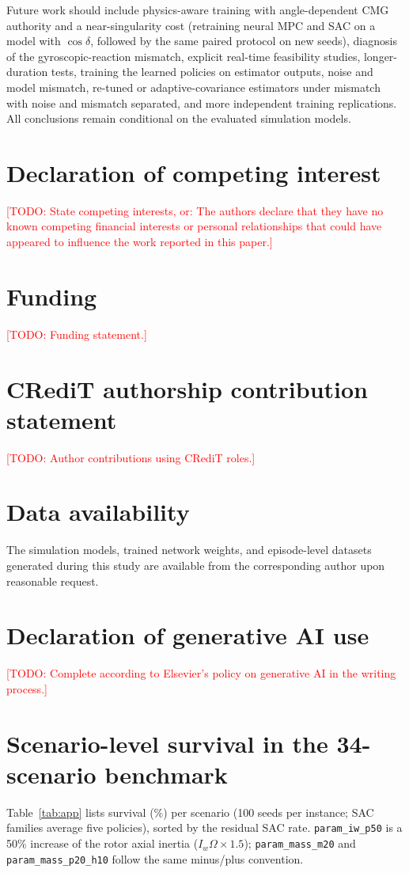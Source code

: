 \documentclass[preprint,12pt,authoryear=false]{elsarticle}
\theoremstyle{remark}\newtheorem{remark}{Remark}
\theoremstyle{plain}\newtheorem{proposition}{Proposition}\newtheorem{lemma}{Lemma}
\theoremstyle{definition}\newtheorem{assumption}{Assumption}
\newcommand{\todo}[1]{\textcolor{red}{[TODO: #1]}}
\begin{document}
Future work should include physics-aware training with angle-dependent CMG authority and a near-singularity cost (retraining neural MPC and SAC on a model with $\cos\delta$, followed by the same paired protocol on new seeds), diagnosis of the gyroscopic-reaction mismatch, explicit real-time feasibility studies, longer-duration tests, training the learned policies on estimator outputs, noise and model mismatch, re-tuned or adaptive-covariance estimators under mismatch with noise and mismatch separated, and more independent training replications. All conclusions remain conditional on the evaluated simulation models.

\section*{Declaration of competing interest}
\todo{State competing interests, or: The authors declare that they have no known competing financial interests or personal relationships that could have appeared to influence the work reported in this paper.}

\section*{Funding}
\todo{Funding statement.}

\section*{CRediT authorship contribution statement}
\todo{Author contributions using CRediT roles.}

\section*{Data availability}
The simulation models, trained network weights, and episode-level datasets generated during this study are available from the corresponding author upon reasonable request.

\section*{Declaration of generative AI use}
\todo{Complete according to Elsevier's policy on generative AI in the writing process.}

\appendix
\section{Scenario-level survival in the 34-scenario benchmark}
Table~\ref{tab:app} lists survival (\%) per scenario (100 seeds per instance; SAC families average five policies), sorted by the residual SAC rate. \texttt{param\_iw\_p50} is a 50\% increase of the rotor axial inertia ($I_w\Omega\times1.5$); \texttt{param\_mass\_m20} and \texttt{param\_mass\_p20\_h10} follow the same minus/plus convention.
\end{document}
